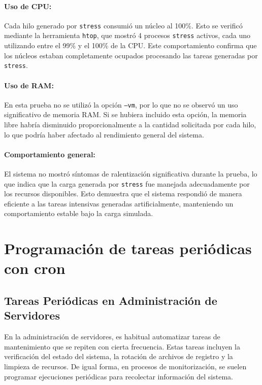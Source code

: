 \begin{enumerate}
    \paragraph{Uso de CPU:}
    Cada hilo generado por \texttt{stress} consumió un núcleo al 100\%. Esto se verificó mediante la herramienta \texttt{htop}, que mostró 4 procesos \texttt{stress} activos, cada uno utilizando entre el 99\% y el 100\% de la CPU. Este comportamiento confirma que los núcleos estaban completamente ocupados procesando las tareas generadas por \texttt{stress}.

    \paragraph{Uso de RAM:}
    En esta prueba no se utilizó la opción \texttt{--vm}, por lo que no se observó un uso significativo de memoria RAM. Si se hubiera incluido esta opción, la memoria libre habría disminuido proporcionalmente a la cantidad solicitada por cada hilo, lo que podría haber afectado al rendimiento general del sistema.

    \paragraph{Comportamiento general:}
    El sistema no mostró síntomas de ralentización significativa durante la prueba, lo que indica que la carga generada por \texttt{stress} fue manejada adecuadamente por los recursos disponibles. Esto demuestra que el sistema respondió de manera eficiente a las tareas intensivas generadas artificialmente, manteniendo un comportamiento estable bajo la carga simulada.



\end{enumerate}

\section{Programación de tareas periódicas con cron}

\subsection*{Tareas Periódicas en Administración de Servidores}

En la administración de servidores, es habitual automatizar tareas de mantenimiento que se repiten con cierta frecuencia. Estas tareas incluyen la verificación del estado del sistema, la rotación de archivos de registro y la limpieza de recursos. De igual forma, en procesos de monitorización, se suelen programar ejecuciones periódicas para recolectar información del sistema.

